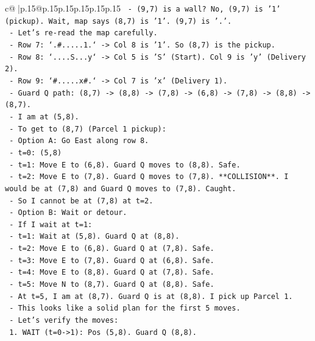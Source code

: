\documentclass{article}
\begin{document}
{\begin{supertabular}{c@{$\;$}|p{.15\linewidth}@{}p{.15\linewidth}p{.15\linewidth}p{.15\linewidth}p{.15\linewidth}p{.15\linewidth}}
{{{\texttt{    {-} (9,7) is a wall? No, (9,7) is '1' (pickup). Wait, map says (8,7) is '1'. (9,7) is '.'.} \\
\texttt{    {-} Let's re{-}read the map carefully.} \\
\texttt{      {-} Row 7: `.\#.....1.` {-}> Col 8 is '1'. So (8,7) is the pickup.} \\
\texttt{      {-} Row 8: `....S...y` {-}> Col 5 is 'S' (Start). Col 9 is 'y' (Delivery 2).} \\
\texttt{      {-} Row 9: `\#.....x\#.` {-}> Col 7 is 'x' (Delivery 1).} \\
\texttt{    {-} Guard Q path: (8,7) {-}> (8,8) {-}> (7,8) {-}> (6,8) {-}> (7,8) {-}> (8,8) {-}> (8,7).} \\
\texttt{    {-} I am at (5,8).} \\
\texttt{    {-} To get to (8,7) (Parcel 1 pickup):} \\
\texttt{      {-} Option A: Go East along row 8.} \\
\texttt{        {-} t=0: (5,8)} \\
\texttt{        {-} t=1: Move E to (6,8). Guard Q moves to (8,8). Safe.} \\
\texttt{        {-} t=2: Move E to (7,8). Guard Q moves to (7,8). **COLLISION**. I would be at (7,8) and Guard Q moves to (7,8). Caught.} \\
\texttt{        {-} So I cannot be at (7,8) at t=2.} \\
\texttt{      {-} Option B: Wait or detour.} \\
\texttt{        {-} If I wait at t=1:} \\
\texttt{          {-} t=1: Wait at (5,8). Guard Q at (8,8).} \\
\texttt{          {-} t=2: Move E to (6,8). Guard Q at (7,8). Safe.} \\
\texttt{          {-} t=3: Move E to (7,8). Guard Q at (6,8). Safe.} \\
\texttt{          {-} t=4: Move E to (8,8). Guard Q at (7,8). Safe.} \\
\texttt{          {-} t=5: Move N to (8,7). Guard Q at (8,8). Safe.} \\
\texttt{          {-} At t=5, I am at (8,7). Guard Q is at (8,8). I pick up Parcel 1.} \\
\texttt{    {-} This looks like a solid plan for the first 5 moves.} \\
\texttt{    {-} Let's verify the moves:} \\
\texttt{      1. WAIT (t=0{-}>1): Pos (5,8). Guard Q (8,8).} \\
}}}
\end{supertabular}}
\end{document}
